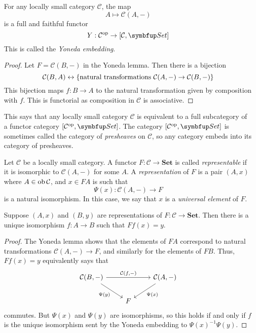 \begin{corollary}
    For any locally small category \( \mathcal C \), the map
    \[ A \mapsto \mathcal C(A, -) \]
    is a full and faithful functor
    \[ Y : \mathcal C^\cop \to [\mathcal C, \mathbf{Set}] \]
    This is called the \emph{Yoneda embedding}.
\end{corollary}
\begin{proof}
    Let \( F = \mathcal C(B, -) \) in the Yoneda lemma.
    Then there is a bijection
    \[ \mathcal C(B, A) \leftrightarrow \qty{\text{natural transformations } \mathcal C(A, -) \to \mathcal C(B, -)} \]
    This bijection maps \( f : B \to A \) to the natural transformation given by composition with \( f \).
    This is functorial as composition in \( \mathcal C \) is associative.
\end{proof}
This says that any locally small category \( \mathcal C \) is equivalent to a full subcategory of a functor category \( [\mathcal C^\cop, \mathbf{Set}] \).
The category \( [\mathcal C^\cop, \mathbf{Set}] \) is sometimes called the category of \emph{presheaves} on \( \mathcal C \), so any category embeds into its category of presheaves.
\begin{definition}
    Let \( \mathcal C \) be a locally small category.
    A functor \( F : \mathcal C \to \mathbf{Set} \) is called \emph{representable} if it is isomorphic to \( \mathcal C(A, -) \) for some \( A \).
    A \emph{representation} of \( F \) is a pair \( (A, x) \) where \( A \in \operatorname{ob} \mathcal C \), and \( x \in FA \) is such that
    \[ \Psi(x) : \mathcal C(A, -) \to F \]
    is a natural isomorphism.
    In this case, we say that \( x \) is a \emph{universal element} of \( F \).
\end{definition}
\begin{corollary}
    Suppose \( (A, x) \) and \( (B, y) \) are representations of \( F : \mathcal C \to \mathbf{Set} \).
    Then there is a unique isomorphism \( f : A \to B \) such that \( Ff(x) = y \).
\end{corollary}
\begin{proof}
    The Yoneda lemma shows that the elements of \( F A \) correspond to natural transformations \( \mathcal C(A, -) \to F \), and similarly for the elements of \( F B \).
    Thus, \( Ff(x) = y \) equivalently says that
    \[\begin{tikzcd}
        {\mathcal C(B, -)} && {\mathcal C(A, -)} \\
        & F
        \arrow["{\mathcal C(f, -)}", from=1-1, to=1-3]
        \arrow["{\Psi(x)}", from=1-3, to=2-2]
        \arrow["{\Psi(y)}"', from=1-1, to=2-2]
    \end{tikzcd}\]
    commutes.
    But \( \Psi(x) \) and \( \Psi(y) \) are isomorphisms, so this holds if and only if \( f \) is the unique isomorphism sent by the Yoneda embedding to \( \Psi(x)^{-1} \Psi(y) \).
\end{proof}
